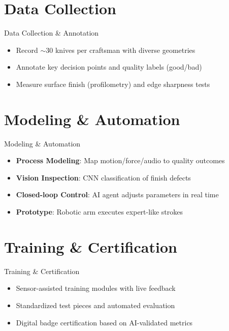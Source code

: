 \documentclass{beamer}
\begin{document}
\section{Data Collection}
\begin{frame}{Data Collection \& Annotation}
  \begin{itemize}
    \item Record $\sim$30 knives per craftsman with diverse geometries
    \item Annotate key decision points and quality labels (good/bad)
    \item Measure surface finish (profilometry) and edge sharpness tests
  \end{itemize}
\end{frame}

\section{Modeling \& Automation}
\begin{frame}{Modeling \& Automation}
  \begin{itemize}
    \item \textbf{Process Modeling}: Map motion/force/audio to quality outcomes
    \item \textbf{Vision Inspection}: CNN classification of finish defects
    \item \textbf{Closed-loop Control}: AI agent adjusts parameters in real time
    \item \textbf{Prototype}: Robotic arm executes expert-like strokes
  \end{itemize}
\end{frame}

\section{Training \& Certification}
\begin{frame}{Training \& Certification}
  \begin{itemize}
    \item Sensor-assisted training modules with live feedback
    \item Standardized test pieces and automated evaluation
    \item Digital badge certification based on AI-validated metrics
  \end{itemize}
\end{frame}
\end{document}
